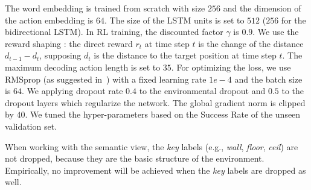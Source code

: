 \documentclass[11pt,a4paper]{article}
\begin{document}
The word embedding is trained from scratch with size $256$ and the dimension of the action embedding is $64$. 
The size of the LSTM units is set to $512$ ($256$ for the bidirectional LSTM).
In RL training, the discounted factor $\gamma$ is $0.9$. 
We use the reward shaping \cite{wu2018building}: the direct reward $r_t$ at time step $t$ is the change of the distance $d_{t-1} - d_t$, supposing $d_t$ is the distance to the target position at time step $t$. 
The maximum decoding action length is set to $35$.
For optimizing the loss, we use RMSprop \cite{hinton2012neural} (as suggested in~) with a fixed learning rate $1e-4$ and the batch size is $64$. 
We applying dropout rate $0.4$ to the environmental dropout and $0.5$ to the dropout layers which regularize the network.
The global gradient norm is clipped by $40$. 
We tuned the hyper-parameters based on the Success Rate of the unseen validation set.

When working with the semantic view, the \emph{key} labels (e.g., \emph{wall}, \emph{floor}, \emph{ceil}) are not dropped, because they are the basic structure of the environment. Empirically, no improvement will be achieved when the \emph{key} labels are dropped as well. 
\end{document}

